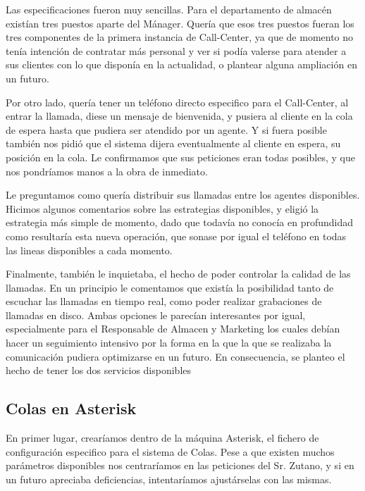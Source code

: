 Las especificaciones fueron muy sencillas. Para el departamento de almacén existían tres puestos aparte del Mánager. Quería que esos tres puestos fueran los tres componentes de la primera instancia de Call-Center, ya que de momento no tenía intención de contratar más personal y ver si podía valerse para atender a sus clientes con lo que disponía en la actualidad, o plantear alguna ampliación en un futuro. 

Por otro lado, quería tener un teléfono directo especifico para el Call-Center, al entrar la llamada, diese un mensaje de bienvenida, y pusiera al cliente en la cola de espera hasta que pudiera ser atendido por un agente. Y si fuera posible también nos pidió que el sistema dijera eventualmente al cliente en espera, su posición en la cola. Le confirmamos que sus peticiones eran todas posibles, y que nos pondríamos manos a la obra de inmediato.

Le preguntamos como quería distribuir sus llamadas entre los agentes disponibles. Hicimos algunos comentarios sobre las estrategias disponibles, y eligió la estrategia más simple de momento, dado que todavía no conocía en profundidad como resultaría esta nueva operación, que sonase por igual el teléfono en todas las lineas disponibles a cada momento.

Finalmente, también le inquietaba, el hecho de poder controlar la calidad de las llamadas. En un principio le comentamos que existía la posibilidad tanto de escuchar las llamadas en tiempo real, como poder realizar grabaciones de llamadas en disco. Ambas opciones le parecían interesantes por igual, especialmente para el Responsable de Almacen y Marketing los cuales debían hacer un seguimiento intensivo por la forma en la que la que se realizaba la comunicación pudiera optimizarse en un futuro. En consecuencia, se planteo el hecho de tener los dos servicios disponibles

\newpage

\color[rgb]{0,0,0}

\subsection{Colas en Asterisk}

En primer lugar, crearíamos dentro de la máquina Asterisk, el fichero de configuración especifico para el sistema de Colas. Pese a que existen muchos parámetros disponibles nos centraríamos en las peticiones del Sr. Zutano, y si en un futuro apreciaba deficiencias, intentaríamos ajustárselas con las mismas.

